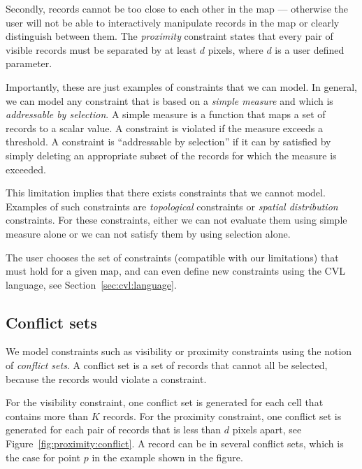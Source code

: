 Secondly, records cannot be too close to each other in the map --- otherwise the user will not be able to interactively manipulate records in the map or clearly distinguish between them. The \emph{proximity} constraint states that every pair of visible records must be separated by at least $d$ pixels, where $d$ is a user defined parameter.

Importantly, these are just examples of constraints that we can model. In general, we can model any constraint that is based on a \emph{simple measure} and which is \emph{addressable by selection}. A simple measure is a function that maps a set of records to a scalar value. A constraint is violated if the measure exceeds a threshold. A constraint is ``addressable by selection'' if it can by satisfied by simply deleting an appropriate subset of the records for which the measure is exceeded.

This limitation implies that there exists constraints that we cannot model. Examples of such constraints are \emph{topological} constraints or \emph{spatial distribution} constraints. For these constraints, either we can not evaluate them using simple measure alone or we can not satisfy them by using selection alone.

The user chooses the set of constraints (compatible with our limitations) that must hold for a given map, and can even define new constraints using the CVL language, see Section~\ref{sec:cvl:language}.

\subsection{Conflict sets}
\label{sec:conflicts}

We model constraints such as visibility or proximity constraints using the notion of \emph{conflict sets}. A conflict set is a set of records that cannot all be selected, because the records would violate a constraint.

For the visibility constraint, one conflict set is generated for each cell that contains more than $K$ records. For the proximity constraint, one conflict set is generated for each pair of records that is less than $d$ pixels apart, see Figure~\ref{fig:proximity:conflict}. A record can be in several conflict sets, which is the case for point $p$ in the example shown in the figure.

